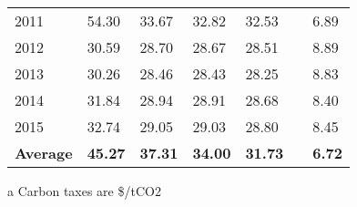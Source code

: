 \begin{table}[]
\begin{threeparttable}
\begin{tabular}{@{}lllllll@{}}
2011                                      & 54.30                                                                    & 33.67                    & 32.82                    & 32.53                     &                      & 6.89                             \\
2012                                      & 30.59                                                                    & 28.70                    & 28.67                    & 28.51                     &                      & 8.89                             \\
2013                                      & 30.26                                                                    & 28.46                    & 28.43                    & 28.25                     &                      & 8.83                             \\
2014                                      & 31.84                                                                    & 28.94                    & 28.91                    & 28.68                     &                      & 8.40                             \\
2015                                      & 32.74                                                                    & 29.05                    & 29.03                    & 28.80                     &                      & 8.45                             \\
\textbf{Average}                          & \textbf{45.27}                                                           & \textbf{37.31}           & \textbf{34.00}           & \textbf{31.73}            & \textbf{}            & \textbf{6.72}                    \\ \bottomrule
\end{tabular}


    \begin{tablenotes}
      \small
      \item a Carbon taxes are \$/tCO2
    \end{tablenotes}

\end{threeparttable}


\end{table}




